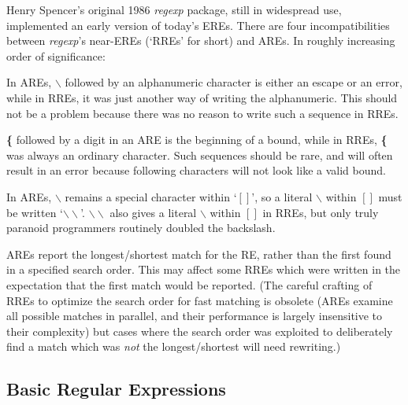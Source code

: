 Henry Spencer's original 1986 {\it regexp} package, still in widespread use,
implemented an early version of today's EREs. There are four incompatibilities between {\it regexp}'s
near-EREs (`RREs' for short) and AREs. In roughly increasing order of significance:
{\itemize
\item
In AREs, {\bf $\backslash$} followed by an alphanumeric character is either an escape or
an error, while in RREs, it was just another way of writing the  alphanumeric.
This should not be a problem because there was no reason to write such
a sequence in RREs. 

\item%
{\bf \{} followed by a digit in an ARE is the beginning of
a bound, while in RREs, {\bf \{} was always an ordinary character. Such sequences
should be rare, and will often result in an error because following characters
will not look like a valid bound. 

\item%
In AREs, {\bf $\backslash$} remains a special character
within `{\bf $[]$}', so a literal {\bf $\backslash$} within {\bf $[]$} must be
written `{\bf $\backslash\backslash$}'. {\bf $\backslash\backslash$} also gives a literal
 {\bf $\backslash$} within {\bf $[]$} in RREs, but only truly paranoid programmers routinely doubled
the backslash. 

\item%
AREs report the longest/shortest match for the RE, rather
than the first found in a specified search order. This may affect some RREs
which were written in the expectation that the first match would be reported.
(The careful crafting of RREs to optimize the search order for fast matching
is obsolete (AREs examine all possible matches in parallel, and their performance
is largely insensitive to their complexity) but cases where the search
order was exploited to deliberately  find a match which was {\it not} the longest/shortest
will need rewriting.)  
}


\subsection{Basic Regular Expressions}\label{wxresynbre}



